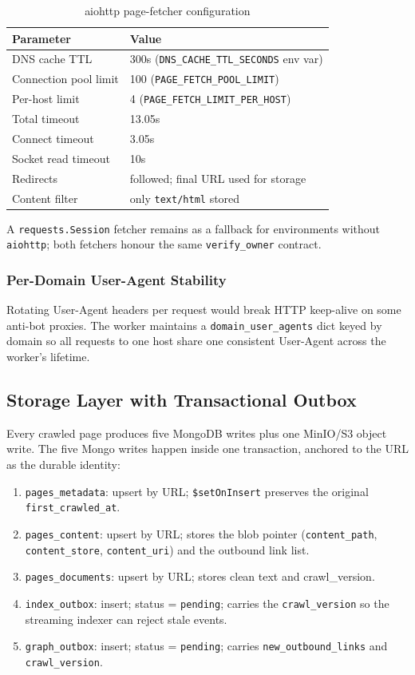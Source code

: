 \documentclass[11pt,a4paper]{article}
\newcommand{\code}[1]{\texttt{#1}}
\begin{document}
\begin{table}[H]
\centering
\caption{aiohttp page-fetcher configuration}
\begin{tabular}{ll}
\toprule
Parameter & Value \\
\midrule
DNS cache TTL & 300s (\code{DNS\_CACHE\_TTL\_SECONDS} env var)\\
Connection pool limit & 100 (\code{PAGE\_FETCH\_POOL\_LIMIT})\\
Per-host limit & 4 (\code{PAGE\_FETCH\_LIMIT\_PER\_HOST})\\
Total timeout & 13.05s\\
Connect timeout & 3.05s\\
Socket read timeout & 10s\\
Redirects & followed; final URL used for storage\\
Content filter & only \code{text/html} stored\\
\bottomrule
\end{tabular}
\end{table}

A \code{requests.Session} fetcher remains as a fallback for environments without \code{aiohttp}; both fetchers honour the same \code{verify\_owner} contract.

\subsubsection{Per-Domain User-Agent Stability}

Rotating User-Agent headers per request would break HTTP keep-alive on some anti-bot proxies. The worker maintains a \code{domain\_user\_agents} dict keyed by domain so all requests to one host share one consistent User-Agent across the worker's lifetime.

\subsection{Storage Layer with Transactional Outbox}
\label{sec:storage}

Every crawled page produces five MongoDB writes plus one MinIO/S3 object write. The five Mongo writes happen inside one transaction, anchored to the URL as the durable identity:

\begin{enumerate}
  \item \code{pages\_metadata}: upsert by URL; \code{\$setOnInsert} preserves the original \code{first\_crawled\_at}.
  \item \code{pages\_content}: upsert by URL; stores the blob pointer (\code{content\_path}, \code{content\_store}, \code{content\_uri}) and the outbound link list.
  \item \code{pages\_documents}: upsert by URL; stores clean text and crawl\_version.
  \item \code{index\_outbox}: insert; status = \code{pending}; carries the \code{crawl\_version} so the streaming indexer can reject stale events.
  \item \code{graph\_outbox}: insert; status = \code{pending}; carries \code{new\_outbound\_links} and \code{crawl\_version}.
\end{enumerate}
\end{document}
